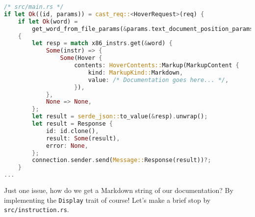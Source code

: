 \begin{lstlisting}[language=rust]
/* src/main.rs */
if let Ok((id, params)) = cast_req::<HoverRequest>(req) {
    if let Ok(word) =
        get_word_from_file_params(&params.text_document_position_params)
    {
        let resp = match x86_instrs.get(&word) {
            Some(instr) => {
                Some(Hover {
                    contents: HoverContents::Markup(MarkupContent {
                        kind: MarkupKind::Markdown,
                        value: /* Documentation goes here... */,
                    }),
            },
            None => None,
        };
        let result = serde_json::to_value(&resp).unwrap();
        let result = Response {
            id: id.clone(),
            result: Some(result),
            error: None,
        };
        connection.sender.send(Message::Response(result))?;
    }
...
\end{lstlisting}

Just one issue, how do we get a Markdown string of our documentation? By implementing the \texttt{Display} trait of course! Let's make a brief stop by \texttt{src/instruction.rs}.

